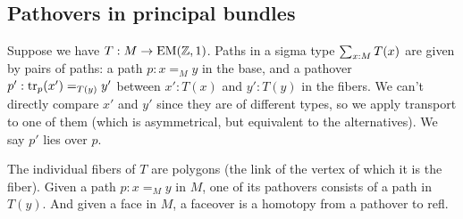 \subsection{Pathovers in principal bundles}
Suppose we have \( T:M\to\mathrm{EM}(\mathbb{Z},1) \). Paths in a sigma type \( \sum_{x:M}T(x) \) are given by pairs of paths: a path \( p:x=_M y \) in the base, and a pathover \( p':\mathrm{tr}_p(x')=_{T(y)}y' \) between \( x':T(x) \) and \( y':T(y) \) in the fibers. We can't directly compare \( x' \) and \( y' \) since they are of different types, so we apply transport to one of them (which is asymmetrical, but equivalent to the alternatives). We say \( p' \) lies over \( p \). 

The individual fibers of \( T \) are polygons (the link of the vertex of which it is the fiber). Given a path \( p:x=_M y \) in \( M \), one of its pathovers consists of a path in \( T(y) \). And given a face in \( M \), a faceover is a homotopy from a pathover to refl.

